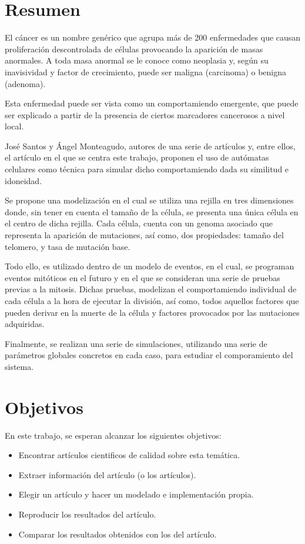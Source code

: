 \section{Resumen}

    El cáncer es un nombre genérico que agrupa más de 200 enfermedades que causan proliferación
    descontrolada de células provocando la aparición de masas anormales. A toda masa anormal se
    le conoce como neoplasia y, según su inavisividad y factor de crecimiento, puede ser maligna
    (carcinoma) o benigna (adenoma).

    Esta enfermedad puede ser vista como un comportamiendo emergente, que puede ser explicado a
    partir de la presencia de ciertos marcadores cancerosos a nivel local.

    José Santos y Ángel Monteagudo, autores de una serie de artículos y, entre ellos, el artículo
    en el que se centra este trabajo, proponen el uso de autómatas celulares como técnica para
    simular dicho comportamiendo dada su similitud e idoneidad.

    Se propone una modelización en el cual se utiliza una rejilla en tres dimensiones donde, sin
    tener en cuenta el tamaño de la célula, se presenta una única célula en el centro de dicha
    rejilla. Cada célula, cuenta con un genoma asociado que representa la aparición de mutaciones,
    así como, dos propiedades: tamaño del telomero, y tasa de mutación base.

    Todo ello, es utilizado dentro de un modelo de eventos, en el cual, se programan eventos mitóticos
    en el futuro y en el que se consideran una serie de pruebas previas a la mitosis. Dichas pruebas,
    modelizan el comportamiendo individual de cada célula a la hora de ejecutar la división, así como,
    todos aquellos factores que pueden derivar en la muerte de la célula y factores provocados
    por las mutaciones adquiridas.

    Finalmente, se realizan una serie de simulaciones, utilizando una serie de parámetros globales
    concretos en cada caso, para estudiar el comporamiento del sistema.

\section{Objetivos}
	En este trabajo, se esperan alcanzar los siguientes objetivos:
	\begin{itemize}
        \item Encontrar artículos cientificos de calidad sobre esta temática.
        \item Extraer información del artículo (o los artículos).
        \item Elegir un artículo y hacer un modelado e implementación propia.
        \item Reproducir los resultados del artículo.
        \item Comparar los resultados obtenidos con los del artículo.
	\end{itemize}
